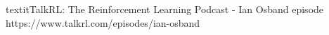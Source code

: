 \documentclass[preview]{standalone}
\begin{document}
textit{TalkRL: The Reinforcement Learning Podcast} - Ian Osband episode https://www.talkrl.com/episodes/ian-osband\\
\end{document}
